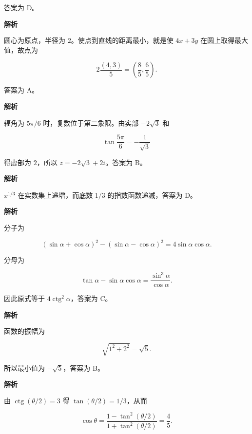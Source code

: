 \begin{answer}
答案为 D。


\textbf{解析}

圆心为原点，半径为 $2$。使点到直线的距离最小，就是使 $4x+3y$ 在圆上取得最大值，故点为

\nopagebreak[4]
\[
2\frac{(4,3)}5=\left(\frac85,\frac65\right).
\]

答案为 A。


\textbf{解析}

辐角为 $5\pi/6$ 时，复数位于第二象限。由实部 $-2\sqrt3$ 和

\nopagebreak[4]
\[
\tan\frac{5\pi}{6}=-\frac1{\sqrt3}
\]

得虚部为 $2$，所以 $z=-2\sqrt3+2i$。答案为 B。


\textbf{解析}

$x^{1/3}$ 在实数集上递增，而底数 $1/3$ 的指数函数递减，答案为 D。


\textbf{解析}

分子为

\nopagebreak[4]
\[
(\sin\alpha+\cos\alpha)^2-(\sin\alpha-\cos\alpha)^2
=4\sin\alpha\cos\alpha.
\]

分母为

\nopagebreak[4]
\[
\tan\alpha-\sin\alpha\cos\alpha
=\frac{\sin^3\alpha}{\cos\alpha}.
\]

因此原式等于 $4\operatorname{ctg}^2\alpha$，答案为 C。


\textbf{解析}

函数的振幅为

\nopagebreak[4]
\[
\sqrt{1^2+2^2}=\sqrt5.
\]

所以最小值为 $-\sqrt5$，答案为 B。


\textbf{解析}

由 $\operatorname{ctg}(\theta/2)=3$ 得 $\tan(\theta/2)=1/3$，从而

\nopagebreak[4]
\[
\cos\theta=\frac{1-\tan^2(\theta/2)}{1+\tan^2(\theta/2)}
=\frac45.
\]


\end{answer}
